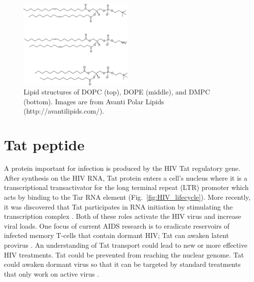 \begin{figure}[htbp]
  \centering
  \includegraphics[width=0.5\textwidth]{figures/lipid_structure}
  \caption[Lipid structures of DOPC (top), DOPE (middle),
  and DMPC (bottom)]
  {Lipid structures of DOPC (top), DOPE (middle),
  and DMPC (bottom). Images are from Avanti Polar Lipids (http://avantilipids.com/).}
  \label{fig:lipid_structure}
\end{figure}

\section{Tat peptide}\label{sec:Tat_peptide}
A protein important for infection is produced by the HIV Tat regulatory gene.
After synthesis on the HIV RNA, Tat protein enters a cell's nucleus where it is a
transcriptional transactivator for the long terminal repeat (LTR)
promoter which acts by binding to the Tar RNA element \cite{Vaishnav91}
(Fig.~\ref{fig:HIV_lifecycle}).
More recently, it was discovered that Tat participates in RNA
initiation by stimulating the transcription complex \cite{Raha05}.
Both of these roles activate the HIV virus and increase viral loads.
One focus of current AIDS research is to eradicate reservoirs of 
infected memory T-cells that contain dormant HIV;
Tat can awaken latent provirus \cite{Macias09}.
An understanding of Tat transport could lead to new or more effective 
HIV treatments. Tat could be prevented from
reaching the nuclear genome. Tat could awaken dormant virus so that
it can be targeted by standard treatments that only
work on active virus \cite{Macias09}. 

